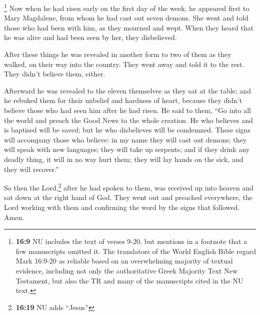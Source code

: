  \footnote{\textbf{16:9} NU includes the text of verses
  9-20, but mentions in a footnote that a few manuscripts omitted it.
  The translators of the World English Bible regard Mark 16:9-20 as
  reliable based on an overwhelming majority of textual evidence,
  including not only the authoritative Greek Majority Text New
  Testament, but also the TR and many of the manuscripts cited in the NU
  text.} Now when he had risen early on the first day of the week, he
appeared first to Mary Magdalene, from whom he had cast out seven
demons.  She went and told those who had been with him,
as they mourned and wept.  When they heard that he was
alive and had been seen by her, they disbelieved.

 After these things he was revealed in another form to
two of them as they walked, on their way into the country.
 They went away and told it to the rest. They didn't
believe them, either.

 Afterward he was revealed to the eleven themselves as
they sat at the table; and he rebuked them for their unbelief and
hardness of heart, because they didn't believe those who had seen him
after he had risen.  He said to them, ``Go into all the
world and preach the Good News to the whole creation.  He
who believes and is baptised will be saved; but he who disbelieves will
be condemned.  These signs will accompany those who
believe: in my name they will cast out demons; they will speak with new
languages;  they will take up serpents; and if they drink
any deadly thing, it will in no way hurt them; they will lay hands on
the sick, and they will recover.''

 So then the Lord,\footnote{\textbf{16:19} NU adds
  ``Jesus''} after he had spoken to them, was received up into heaven
and sat down at the right hand of God.  They went out and
preached everywhere, the Lord working with them and confirming the word
by the signs that followed. Amen.
